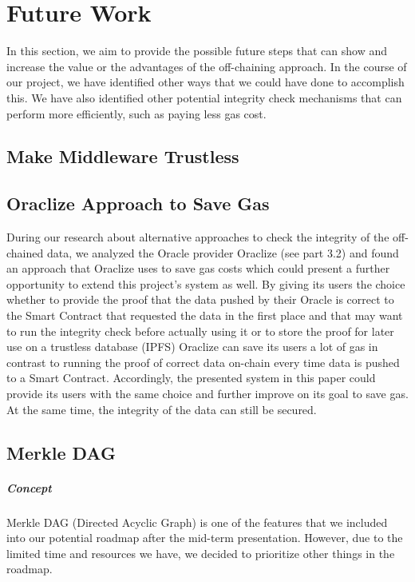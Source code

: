 \section{Future Work}

In this section, we aim to provide the possible future steps that can show and increase the value or the advantages of the off-chaining approach. In the course of our project, we have identified other ways that we could have done to accomplish this. We have also identified other potential integrity check mechanisms that can perform more efficiently, such as paying less gas cost. 

\subsection{Make Middleware Trustless}

\subsection{Oraclize Approach to Save Gas}
During our research about alternative approaches to check the integrity of the off-chained data, we analyzed the Oracle provider Oraclize (see part 3.2) and found an approach that Oraclize uses to save gas costs which could present a further opportunity to extend this project’s system as well. By giving its users the choice whether to provide the proof that the data pushed by their Oracle is correct to the Smart Contract that requested the data in the first place and that may want to run the integrity check before actually using it or to store the proof for later use on a trustless database (IPFS) Oraclize can save its users a lot of gas in contrast to running the proof of correct data on-chain every time data is pushed to a Smart Contract. Accordingly, the presented system in this paper could provide its users with the same choice and further improve on its goal to save gas. At the same time, the integrity of the data can still be secured.

\subsection{Merkle DAG}
\subparagraph{Concept}
Merkle DAG (Directed Acyclic Graph) is one of the features that we included into our potential roadmap after the mid-term presentation. However, due to the limited time and resources we have, we decided to prioritize other things in the roadmap.

